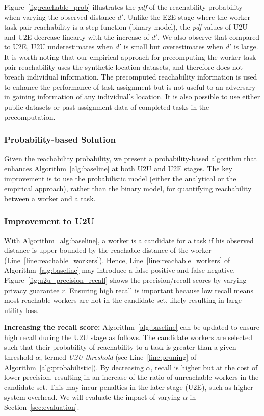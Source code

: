 \documentclass{USC-Thesis}
\numberwithin{equation}{chapter}
\begin{document}
Figure~\ref{fig:reachable_prob} illustrates the \emph{pdf} of the reachability probability when varying the observed distance $d'$. Unlike the E2E stage where the worker-task pair reachability is a step function (binary model), the \emph{pdf} values of U2U and U2E decrease linearly with the increase of $d'$.
We also observe that compared to U2E, U2U underestimates when $d'$ is small but overestimates when $d'$ is large. It is worth noting that our empirical approach for precomputing the worker-task pair reachability uses the synthetic location datasets, and therefore does not breach individual information. The precomputed reachability information is used to enhance the performance of task assignment but is not useful to an adversary in gaining information of any individual's location. It is also possible to use either public datasets or past assignment data of completed tasks in the precomputation.


\subsubsection{Probability-based Solution}
\label{sec:improved}
Given the reachability probability, we present a probability-based algorithm that enhances Algorithm~\ref{alg:baseline} at both U2U and U2E stages. The key improvement is to use the probabilistic model (either the analytical or the empirical approach), rather than the binary model, for quantifying reachability between a worker and a task.

\subsubsection{Improvement to U2U}
\label{sec:u2u_improve}

With Algorithm~\ref{alg:baseline}, a worker is a candidate for a task if his observed distance is upper-bounded by the reachable distance of the worker (Line~\ref{line:reachable_workers}).
Hence, Line~\ref{line:reachable_workers} of Algorithm~\ref{alg:baseline} may introduce a false positive and false negative. Figure~\ref{fig:u2u_precision_recall} shows the precision/recall scores by varying privacy guarantee $r$. Ensuring high recall is important because low recall means most reachable workers are not in the candidate set, likely resulting in large utility loss.

\textbf{Increasing the recall score:} Algorithm~\ref{alg:baseline} can be updated to ensure high recall during the U2U stage as follows. The candidate workers are selected such that their probability of reachability to a task is greater than a given threshold $\alpha$, termed \emph{U2U threshold} (see Line~\ref{line:pruning} of Algorithm~\ref{alg:probabilistic}).
By decreasing $\alpha$, recall is higher but at the cost of lower precision, resulting in an increase of the ratio of unreachable workers in the candidate set. This may incur penalties in the later stage (U2E), such as higher system overhead. We will evaluate the impact of varying $\alpha$ in Section~\ref{sec:evaluation}.
\end{document}
